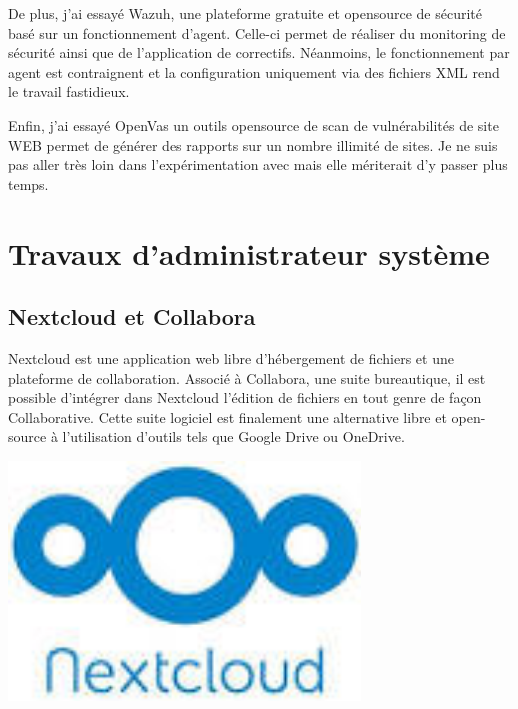 \documentclass[12pt]{article}
\begin{document}
De plus, j'ai essayé Wazuh, une plateforme gratuite et opensource de sécurité basé sur un fonctionnement d'agent. 
Celle-ci permet de réaliser du monitoring de sécurité ainsi que de l'application de correctifs.
Néanmoins, le fonctionnement par agent est contraignent et la configuration uniquement via des fichiers XML rend le travail fastidieux.

Enfin, j'ai essayé OpenVas un outils opensource de scan de vulnérabilités de site WEB permet de générer des rapports sur un nombre illimité de sites. 
Je ne suis pas aller très loin dans l'expérimentation avec mais elle mériterait d'y passer plus temps.

\newpage
\section{Travaux d'administrateur système}
\subsection{\gls{Nextcloud} et \gls{Collabora}}
\noindent%
\begin{minipage}{.7\textwidth}%
\gls{Nextcloud} est une application web libre d'hébergement de fichiers et une plateforme de collaboration. 
Associé à \gls{Collabora}, une suite bureautique, il est possible d'intégrer dans \gls{Nextcloud} l'édition de fichiers en tout genre de façon Collaborative. 
Cette suite logiciel est finalement une alternative libre et open-source à l'utilisation d'outils tels que Google Drive ou OneDrive.
\end{minipage}%
\hfill
\begin{minipage}{.3\textwidth}%
\begin{center}
\includegraphics[width=0.7\textwidth]{src/logo_nextcloud.jpeg}
\end{center}
\end{minipage}%
\end{document}
